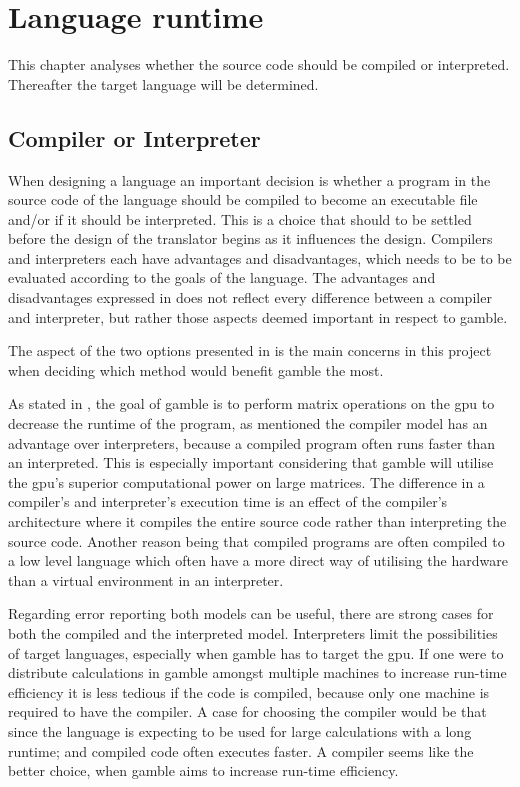 \chapter{Language runtime}
This chapter analyses whether the source code should be compiled or interpreted.
Thereafter the target language will be determined. 

\section{Compiler or Interpreter}
When designing a language an important decision is whether a program in the source code of the language should be compiled to become an executable file and/or if it should be interpreted.
This is a choice that should to be settled before the design of the translator begins as it influences the design. 
Compilers and interpreters each have advantages and disadvantages, which needs to be to be evaluated according to the goals of the language.
The advantages and disadvantages expressed in  does not reflect every difference between a compiler and interpreter, but rather those aspects deemed important in respect to \gls{gamble}.



The aspect of the two options presented in  is the main concerns in this project when deciding which method would benefit \gls{gamble} the most.

As stated in , the goal of \gls{gamble} is to perform matrix operations on the \acrshort{gpu} to decrease the runtime of the program, as mentioned the compiler model has an advantage over interpreters, because a compiled program often runs faster than an interpreted. 
This is especially important considering that \gls{gamble} will utilise the \acrshort{gpu}'s superior computational power on large matrices. 
The difference in a compiler's and interpreter's execution time is an effect of the compiler's architecture where it compiles the entire source code rather than interpreting the source code. 
Another reason being that compiled programs are often compiled to a low level language which often have a more direct way of utilising the hardware than a virtual environment in an interpreter.

Regarding error reporting both models can be useful, there are strong cases for both the compiled and the interpreted model.
Interpreters limit the possibilities of target languages, especially when \gls{gamble} has to target the \acrshort{gpu}.
If one were to distribute calculations in \gls{gamble} amongst multiple machines to increase run-time efficiency it is less tedious if the code is compiled, because only one machine is required to have the compiler.
A case for choosing the compiler would be that since the language is expecting to be used for large calculations with a long runtime; and compiled code often executes faster.\citep{SonicSpeedCompiler}
A compiler seems like the better choice, when \gls{gamble} aims to increase run-time efficiency.

